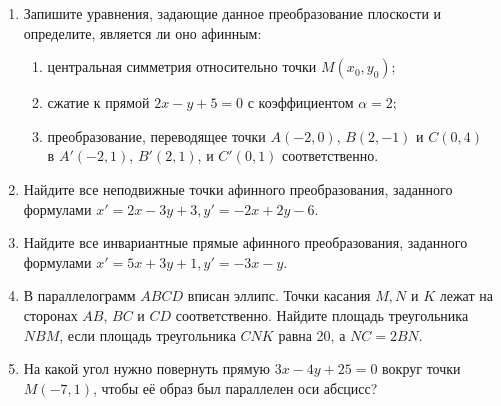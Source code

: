 \begin{enumerate}
    \item Запишите уравнения, задающие данное преобразование плоскости и определите, является ли оно афинным:
        \begin{enumerate}
            \item центральная симметрия относительно точки $M(x_0, y_0)$;
            \item сжатие к прямой $2x - y + 5 = 0$ с коэффициентом $\alpha = 2$;
            \item преобразование, переводящее точки $A(-2, 0)$, $B(2, -1)$ и $C(0, 4)$ \\в $A'(-2, 1)$, $B'(2, 1)$, и $C'(0, 1)$ соответственно.
        \end{enumerate}
   		
   \item  Найдите все неподвижные точки афинного преобразования, заданного формулами $x' = 2x - 3y +3, y' = -2x + 2y - 6$.
	
	\item Найдите все инвариантные прямые афинного преобразования, заданного формулами $x' = 5x + 3y +1, y' = -3x - y$.
	
	\item В параллелограмм $ABCD$ вписан эллипс. Точки касания $M, N$ и $K$ лежат на сторонах $AB$, $BC$ и $CD$ соответственно. Найдите площадь треугольника $NBM$, если площадь треугольника $CNK$ равна 20, а $NC = 2BN$.
	
	\item На какой угол нужно повернуть прямую $3x - 4y + 25 = 0$ вокруг точки $M(-7, 1)$, чтобы её образ был параллелен оси абсцисс?
	
\end{enumerate}